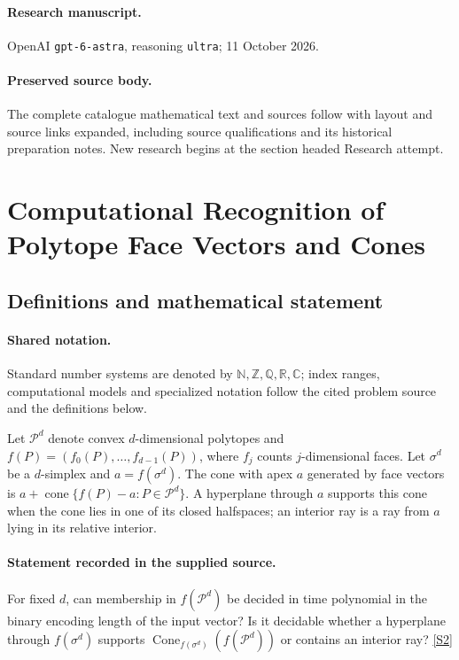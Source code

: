 \documentclass[11pt]{article}
\begin{document}
\paragraph{Research manuscript.} OpenAI \texttt{gpt-6-astra}, reasoning \texttt{ultra}; 11 October 2026.
\paragraph{Preserved source body.} The complete catalogue mathematical text and sources follow with layout and source links expanded, including source qualifications and its historical preparation notes. New research begins at the section headed Research attempt.

\section{Computational Recognition of Polytope Face Vectors and Cones}\label{statement}

\subsection{Definitions and mathematical statement}

\paragraph{Shared notation.}Standard number systems are denoted by $\mathbb N,\mathbb Z,\mathbb Q,\mathbb R,\mathbb C$; index ranges, computational models and specialized notation follow the cited problem source and the definitions below.


Let $\mathcal P^d$ denote convex $d$-dimensional polytopes and $f(P)=(f_0(P),\ldots,f_{d-1}(P))$, where $f_j$ counts $j$-dimensional faces. Let $\sigma^d$ be a $d$-simplex and $a=f(\sigma^d)$. The cone with apex $a$ generated by face vectors is $a+\operatorname{cone}\{f(P)-a:P\in\mathcal P^d\}$. A hyperplane through $a$ supports this cone when the cone lies in one of its closed halfspaces; an interior ray is a ray from $a$ lying in its relative interior.
\paragraph{Statement recorded in the supplied source.}
For fixed $d$, can membership in $f(\mathcal P^d)$ be decided in time polynomial in the binary encoding length of the input vector? Is it decidable whether a hyperplane through $f(\sigma^d)$ supports $\operatorname{Cone}_{f(\sigma^d)}(f(\mathcal P^d))$ or contains an interior ray? \href{https://doi.org/10.4171/owr/2019/39}{[S2]}
\end{document}
